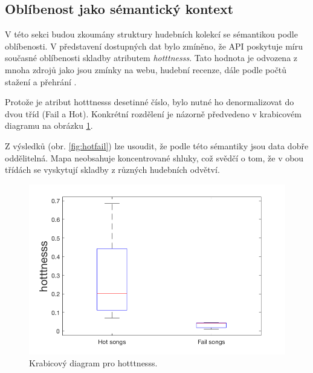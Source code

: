 \documentclass[thesis=M,czech]{FITthesis}[2012/06/26]
\begin{document}
\subsection{Oblíbenost jako sémantický kontext}\label{sec:hotness}
V této sekci budou zkoumány struktury hudebních kolekcí se sémantikou podle oblíbenosti. V představení dostupných dat bylo zmíněno, že API poskytuje míru současné oblíbenosti skladby atributem \textit{hotttnesss}. Tato hodnota je odvozena z mnoha zdrojů jako jsou zmínky na webu, hudební recenze, dále podle počtů stažení a přehrání \cite{hotttnesss}.

Protože je atribut hotttnesss desetinné číslo, bylo nutné ho denormalizovat do dvou tříd (Fail a Hot). Konkrétní rozdělení je názorně předvedeno v krabicovém diagramu na obrázku \ref{fig:boxplot}.

Z výsledků (obr. \ref{fig:hotfail}) lze usoudit, že podle této sémantiky jsou data dobře oddělitelná. Mapa neobsahuje koncentrované shluky, což svědčí o tom, že v obou třídách se vyskytují skladby z různých hudebních odvětví.



\begin{figure}[htbp]
\begin{center}
	\includegraphics[scale=0.25]{exp_boxplot.png}
\caption{Krabicový diagram pro hotttnesss.}
\label{fig:boxplot}
\end{center}
\end{figure}

  
\end{document}
